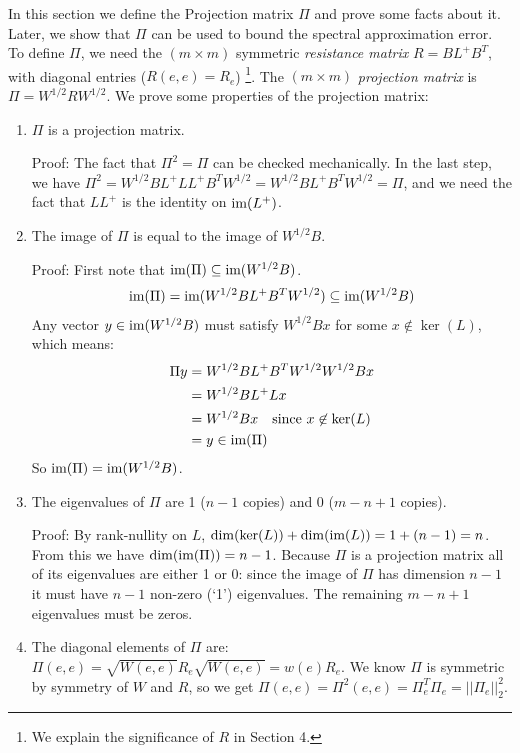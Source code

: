 \documentclass{article}
\begin{document}
In this section we define the Projection matrix $\Pi$ and prove some facts
about it. Later, we show that $\Pi$ can be used to bound the spectral
approximation error.  To define $\Pi$, we need the $(m \times m)$ symmetric
\textit{resistance matrix} $R = BL^+B^T$, with diagonal entries ($R(e,
e) = R_e$) \footnote{We explain the significance of $R$ in Section 4.}.  The
$(m \times m)$ \textit{projection matrix} is $\Pi = W^{1/2}RW^{1/2}$. We
prove some properties of the projection matrix:
\begin{enumerate}[1.]
    \item $\Pi$ is a projection matrix.
        
        Proof: The fact that $\Pi^2 = \Pi$ can be checked mechanically. In
        the last step, we have $\Pi^2 = W^{1/2}BL^+LL^+B^TW^{1/2} =
        W^{1/2}BL^+B^TW^{1/2} = \Pi$, and we need the fact that $LL^+$ is
        the identity on $\text{im}(L^+)$.

    \item The image of $\Pi$ is equal to the image of $W^{1/2}B$.
        
        Proof: First note that $\text{im}(\Pi) \subseteq \text{im}(W^{1/2}B)$.
        \begin{align*}
            \text{im}(\Pi) = \text{im}(W^{1/2}BL^+B^TW^{1/2}) \subseteq \text{im}(W^{1/2}B)
        \end{align*}
        Any vector $y \in \text{im}(W^{1/2}B)$ must satisfy $W^{1/2}Bx$ for some
        $x \not\in \ker(L)$, which means:
        \begin{align*}
            \Pi y &= W^{1/2}BL^+B^TW^{1/2}W^{1/2}Bx \\
                  &= W^{1/2}BL^+Lx \\
                  &= W^{1/2}Bx \quad \text{since } x \not\in \ker(L) \\
                  &= y \in \text{im}(\Pi)
        \end{align*}
        So $\text{im}(\Pi) = \text{im}(W^{1/2}B)$.

    \item The eigenvalues of $\Pi$ are 1 ($n-1$ copies) and 0 ($m-n+1$
        copies).

        Proof: By rank-nullity on $L$, $\dim(\ker(L)) + \dim(\text{im}(L)) = 1 +
        (n-1) = n$. From this we have $\dim(\text{im}(\Pi)) = n-1$. Because $\Pi$
        is a projection matrix all of its eigenvalues are either 1 or 0:
        since the image of $\Pi$ has dimension $n-1$ it must have $n-1$
        non-zero (`1') eigenvalues. The remaining $m-n+1$ eigenvalues must
        be zeros.

    \item The diagonal elements of $\Pi$ are: $\Pi(e, e) = \sqrt{W(e,
        e)}R_e\sqrt{W(e, e)} = w(e)R_e$. We know $\Pi$ is symmetric by
        symmetry of $W$ and $R$, so we get $\Pi(e, e) = \Pi^2(e, e) =
        \Pi_e^T\Pi_e = ||\Pi_e||^2_2$.
\end{enumerate}
\end{document}
